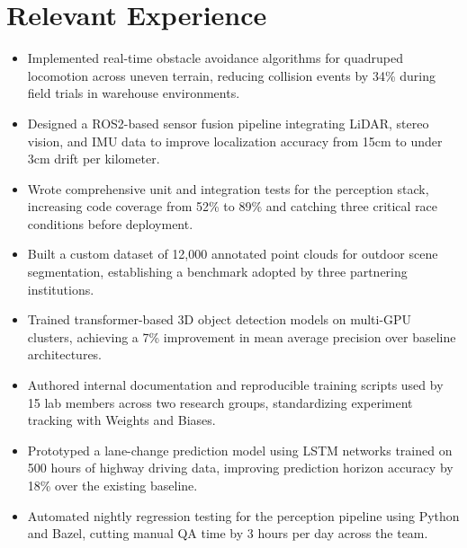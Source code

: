 \documentclass{slate-resume}
\begin{document}
\section{Relevant Experience}
\begin{entryblock}
\begin{itemize}
  \item Implemented real-time obstacle avoidance algorithms for quadruped locomotion across uneven terrain, reducing collision events by 34\% during field trials in warehouse environments.
  \item Designed a ROS2-based sensor fusion pipeline integrating LiDAR, stereo vision, and IMU data to improve localization accuracy from 15cm to under 3cm drift per kilometer.
  \item Wrote comprehensive unit and integration tests for the perception stack, increasing code coverage from 52\% to 89\% and catching three critical race conditions before deployment.
\end{itemize}
\end{entryblock}
\entrygap
\begin{entryblock}
\begin{itemize}
  \item Built a custom dataset of 12,000 annotated point clouds for outdoor scene segmentation, establishing a benchmark adopted by three partnering institutions.
  \item Trained transformer-based 3D object detection models on multi-GPU clusters, achieving a 7\% improvement in mean average precision over baseline architectures.
  \item Authored internal documentation and reproducible training scripts used by 15 lab members across two research groups, standardizing experiment tracking with Weights and Biases.
\end{itemize}
\end{entryblock}
\entrygap
\begin{entryblock}
\begin{itemize}
  \item Prototyped a lane-change prediction model using LSTM networks trained on 500 hours of highway driving data, improving prediction horizon accuracy by 18\% over the existing baseline.
  \item Automated nightly regression testing for the perception pipeline using Python and Bazel, cutting manual QA time by 3 hours per day across the team.
\end{itemize}
\end{entryblock}
\end{document}
